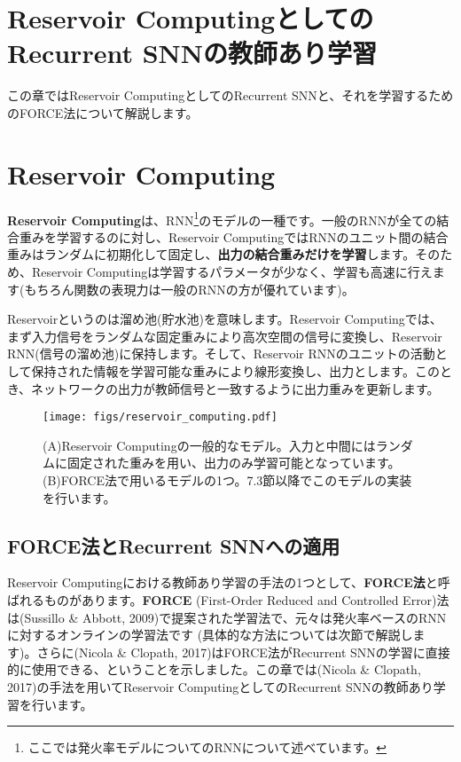 \section{Reservoir ComputingとしてのRecurrent SNNの教師あり学習}
この章ではReservoir ComputingとしてのRecurrent SNNと、それを学習するためのFORCE法について解説します。
\section{Reservoir Computing}
\textbf{Reservoir Computing}は、RNN\footnote{ここでは発火率モデルについてのRNNについて述べています。}のモデルの一種です。一般のRNNが全ての結合重みを学習するのに対し、Reservoir ComputingではRNNのユニット間の結合重みはランダムに初期化して固定し、\textbf{出力の結合重みだけを学習}します。そのため、Reservoir Computingは学習するパラメータが少なく、学習も高速に行えます(もちろん関数の表現力は一般のRNNの方が優れています)。\par
Reservoirというのは溜め池(貯水池)を意味します。Reservoir Computingでは、まず入力信号をランダムな固定重みにより高次空間の信号に変換し、Reservoir RNN(信号の溜め池)に保持します。そして、Reservoir RNNのユニットの活動として保持された情報を学習可能な重みにより線形変換し、出力とします。このとき、ネットワークの出力が教師信号と一致するように出力重みを更新します。
\begin{figure}[htbp]
    \centering
    \texttt{[image: figs/reservoir\_computing.pdf]}
    \caption{(A)Reservoir Computingの一般的なモデル。入力と中間にはランダムに固定された重みを用い、出力のみ学習可能となっています。 (B)FORCE法で用いるモデルの1つ。7.3節以降でこのモデルの実装を行います。}
    \label{fig:RC}
\end{figure}
\subsection{FORCE法とRecurrent SNNへの適用}
Reservoir Computingにおける教師あり学習の手法の1つとして、\textbf{FORCE法}と呼ばれるものがあります。\textbf{FORCE} (First-Order Reduced and Controlled Error)法は(Sussillo \& Abbott, 2009)で提案された学習法で、元々は発火率ベースのRNNに対するオンラインの学習法です (具体的な方法については次節で解説します)。さらに(Nicola \& Clopath, 2017)はFORCE法がRecurrent SNNの学習に直接的に使用できる、ということを示しました。この章では(Nicola \& Clopath, 2017)の手法を用いてReservoir ComputingとしてのRecurrent SNNの教師あり学習を行います。
